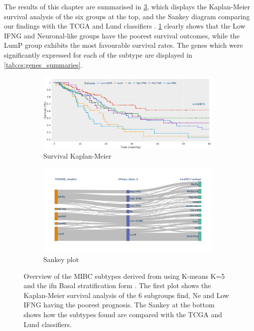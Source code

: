 The results of this chapter are summarised in \cref{fig:cs:overview_K_means_6}, which displays the Kaplan-Meier survival analysis of the six groups at the top, and the Sankey diagram comparing our findings with the TCGA and Lund classifiers \citet{Robertson2017-mg,Marzouka2018-ge}. \cref{fig:cs:overview_survival} clearly shows that the Low IFNG and Neuronal-like groups have the poorest survival outcomes, while the LumP group exhibits the most favourable survival rates. The genes which were significantly expressed for each of the subtype are displayed in \cref{tab:cs:genes_summaries}.
 
\begin{figure}[!htb]
    \centering
    \begin{subfigure}[!t]{1.0\textwidth}
        \includegraphics[width=\textwidth,keepaspectratio]{Sections/ClusteringAnalysis/Resources/discussion/survival_K_6.png}    
        \caption{Survival Kaplan-Meier}
        \label{fig:cs:overview_survival}
    \end{subfigure}
    \centering
    \begin{subfigure}[!t]{1.0\textwidth}
        \includegraphics[width=\textwidth,keepaspectratio]{Sections/ClusteringAnalysis/Resources/discussion/KMeans_6_comp.png}
        \caption{Sankey plot}
        \label{fig:cs:overview_comp}
    \end{subfigure} 
    \centering
    \caption{Overview of the MIBC subtypes derived from using K-means K=5 and the \acrshort{ifn} Basal stratification form \citet{Baker2022-bj}. The first plot shows the Kaplan-Meier survival analysis of the 6 subgroups find, Ne and Low IFNG having the poorest prognosis. The Sankey at the bottom shows how the subtypes found are compared with the TCGA \citet{Robertson2017-mg} and Lund \citet{Marzouka2018-ge} classifiers.} 
    \label{fig:cs:overview_K_means_6}
\end{figure}


